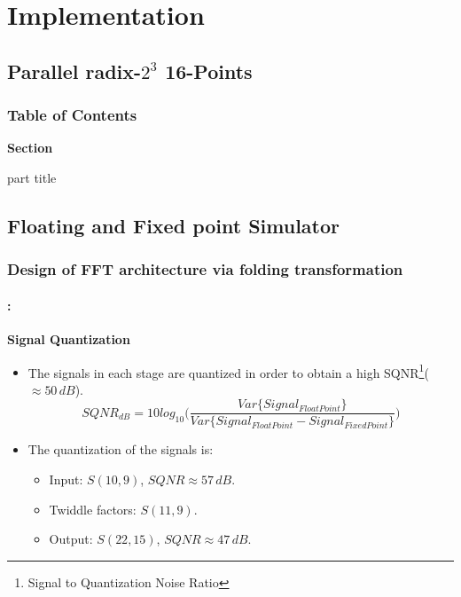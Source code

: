 \section{Implementation}
\subsection{Parallel radix-$2^3$ 16-Points}
\begin{frame}
  \frametitle{\textbf{Table of Contents}}
  \begin{center}
    {\vspace{-1.5cm}\Large \textbf{Section \thesection}\vspace{0.5cm}}
    \begin{beamercolorbox}[
      sep=8pt,center]{part title}
      \textbf{\insertsection}
    \end{beamercolorbox}
  \end{center}
\end{frame}


\subsection{Floating and Fixed point Simulator}


\begin{frame}
	\frametitle{\textbf{Design of FFT architecture via folding transformation}}
	\framesubtitle{\secname : \subsecname}
	\begin{block}{\centering \textbf{Signal Quantization}}
		\begin{itemize}\justifying\footnotesize
        	\item The signals in each stage are quantized in order to obtain a high SQNR\footnote{Signal to Quantization Noise Ratio}($\approx 50\, dB$).
			\begin{equation*}%
			SQNR_{dB} = 10log_{10} \bigg(  \frac{  Var\{Signal_{FloatPoint}\}  }{  Var\{Signal_{FloatPoint} - Signal_{FixedPoint}\}}  \bigg)
			\end{equation*}
			\item The quantization of the signals is:
			\begin{itemize}\justifying\footnotesize
				\item Input: $S(10,9)$, $SQNR \approx 57\,dB$.
				\item Twiddle factors: $S(11,9)$.
				\item Output: $S(22,15)$, $SQNR \approx 47\,dB$.				
			\end{itemize}			 
		\end{itemize}	
	\end{block}
\end{frame}



